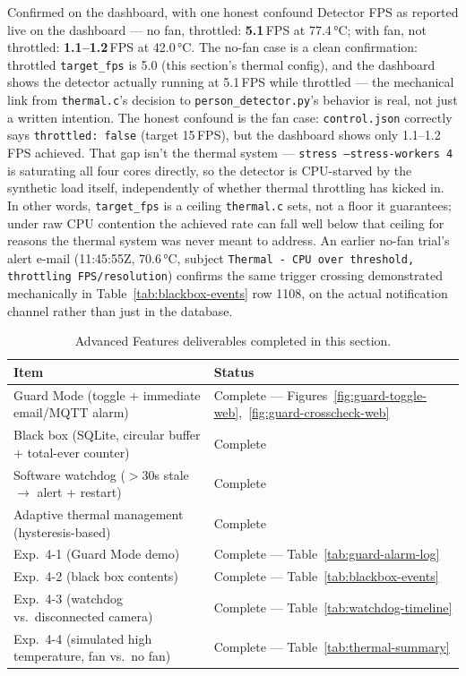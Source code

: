 \begin{answersection}{Confirmed on the dashboard, with one honest confound}
Detector FPS as reported live on the dashboard --- no fan, throttled:
\textbf{5.1}\,FPS at 77.4\,°C; with fan, not throttled: \textbf{1.1--1.2}\,FPS
at 42.0\,°C. The no-fan case is a clean confirmation: throttled
\texttt{target\_fps} is 5.0 (this section's thermal config), and the
dashboard shows the detector actually running at 5.1\,FPS while
throttled --- the mechanical link from \texttt{thermal.c}'s decision to
\texttt{person\_detector.py}'s behavior is real, not just a written
intention. The honest confound is the fan case: \texttt{control.json}
correctly says \texttt{throttled: false} (target 15\,FPS), but the
dashboard shows only 1.1--1.2\,FPS achieved. That gap isn't the thermal
system --- \texttt{stress --stress-workers 4} is saturating all four
cores directly, so the detector is CPU-starved by the synthetic load
itself, independently of whether thermal throttling has kicked in. In
other words, \texttt{target\_fps} is a ceiling \texttt{thermal.c} sets,
not a floor it guarantees; under raw CPU contention the achieved rate
can fall well below that ceiling for reasons the thermal system was
never meant to address. An earlier no-fan trial's alert e-mail (11:45:55Z,
70.6\,°C, subject \texttt{Thermal - CPU over threshold, throttling
FPS/resolution}) confirms the same trigger crossing demonstrated
mechanically in Table~\ref{tab:blackbox-events} row 1108, on the actual
notification channel rather than just in the database.
\end{answersection}


\begin{table}[H]
\centering
\caption{Advanced Features deliverables completed in this section.}
\label{tab:advanced-summary}
\begin{tabular}{ll}
\toprule
\textbf{Item} & \textbf{Status} \\
\midrule
Guard Mode (toggle + immediate email/MQTT alarm) & Complete --- Figures~\ref{fig:guard-toggle-web},~\ref{fig:guard-crosscheck-web} \\
Black box (SQLite, circular buffer + total-ever counter) & Complete \\
Software watchdog ($>$30s stale $\to$ alert + restart) & Complete \\
Adaptive thermal management (hysteresis-based) & Complete \\
Exp.\ 4-1 (Guard Mode demo) & Complete --- Table~\ref{tab:guard-alarm-log} \\
Exp.\ 4-2 (black box contents) & Complete --- Table~\ref{tab:blackbox-events} \\
Exp.\ 4-3 (watchdog vs.\ disconnected camera) & Complete --- Table~\ref{tab:watchdog-timeline} \\
Exp.\ 4-4 (simulated high temperature, fan vs.\ no fan) & Complete --- Table~\ref{tab:thermal-summary} \\
\bottomrule
\end{tabular}
\end{table}